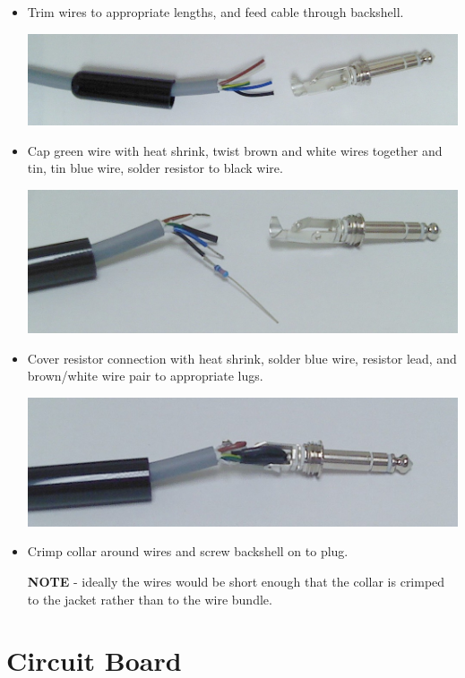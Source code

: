 \begin{itemize}
%
\item Trim wires to appropriate lengths, and feed cable through backshell.

\includegraphics[width=0.8\columnwidth]
{photos/pump-box-20181030/plug-started.jpg}

\item Cap green wire with heat shrink, twist brown and white wires together
and tin, tin blue wire, solder resistor to black wire.

\includegraphics[width=0.8\columnwidth]
{photos/pump-box-20181030/plug-midway.jpg}

\item Cover resistor connection with heat shrink, solder blue wire,
resistor lead, and brown/white wire pair to appropriate lugs.

\includegraphics[width=0.8\columnwidth]
{photos/pump-box-20181030/plug-done.jpg}

\item Crimp collar around wires and screw backshell on to plug.

\textbf{NOTE} - ideally the wires would be short enough that the collar is
crimped to the jacket rather than to the wire bundle.
%
\end{itemize}

\clearpage
\section{Circuit Board}
\label{sect-pumpbox-board}

